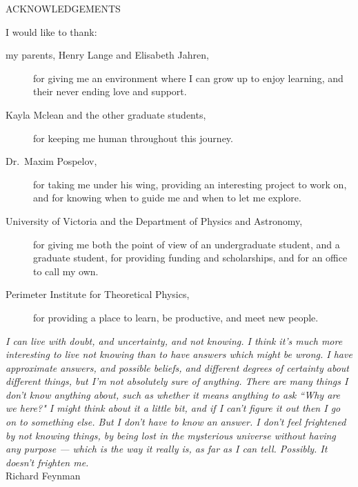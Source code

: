 \newpage
{}

\begin{center}
ACKNOWLEDGEMENTS
\end{center}

\noindent I would like to thank:
\begin{description}
\item[my parents, Henry Lange and Elisabeth Jahren,]
    for giving me an environment where I can grow up to enjoy learning, and their never ending love and support.
\item[Kayla Mclean and the other graduate students,]
    for keeping me human throughout this journey.
\item[Dr.~Maxim Pospelov,]
    for taking me under his wing, providing an interesting project to work on, and for knowing when to guide me and when to let me explore.
\item[University of Victoria and the Department of Physics and Astronomy,]
    for giving me both the point of view of an undergraduate student, and a graduate student, for providing funding and scholarships, and for an office to call my own.
\item[Perimeter Institute for Theoretical Physics,]
    for providing a place to learn, be productive, and meet new people.
\end{description}

\begin{flushright}
\textit{I can live with doubt, and uncertainty, and not
knowing. I think it's much more interesting to live not
knowing than to have answers which might be wrong.
I have approximate answers, and possible beliefs,
and different degrees of certainty about different things,
but I'm not absolutely sure of anything.
There are many things I don't know anything about,
such as whether it means anything to ask ``Why are we here?"
I might think about it a little bit, and if I can't
figure it out then I go on to something else.
But I don't have to know an answer.
I don't feel frightened by not knowing things,
by being lost in the mysterious universe without having any purpose —
which is the way it really is, as far as I can tell.
Possibly. It doesn't frighten me.}
\\
Richard Feynman\\
\end{flushright}
